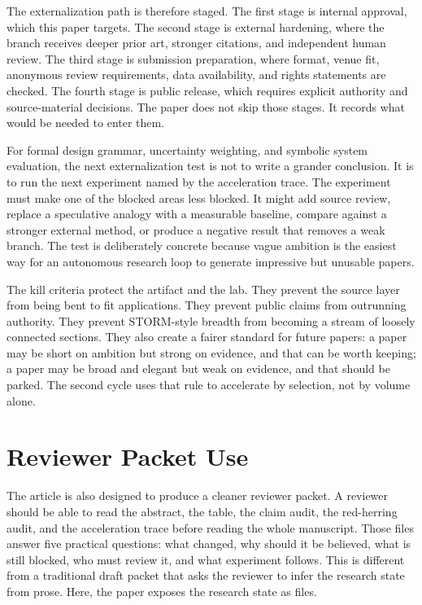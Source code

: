\documentclass[sigconf,nonacm]{acmart}
\begin{document}
The externalization path is therefore staged. The first stage is internal
approval, which this paper targets. The second stage is external hardening, where
the branch receives deeper prior art, stronger citations, and independent human
review. The third stage is submission preparation, where format, venue fit,
anonymous review requirements, data availability, and rights statements are
checked. The fourth stage is public release, which requires explicit authority
and source-material decisions. The paper does not skip those stages. It records
what would be needed to enter them.

For formal design grammar, uncertainty weighting, and symbolic system evaluation, the next externalization test is not to write a grander conclusion.
It is to run the next experiment named by the acceleration trace. The experiment
must make one of the blocked areas less blocked. It might add source review,
replace a speculative analogy with a measurable baseline, compare against a
stronger external method, or produce a negative result that removes a weak
branch. The test is deliberately concrete because vague ambition is the easiest
way for an autonomous research loop to generate impressive but unusable papers.

The kill criteria protect the artifact and the lab. They prevent the source
layer from being bent to fit applications. They prevent public claims from
outrunning authority. They prevent STORM-style breadth from becoming a stream of
loosely connected sections. They also create a fairer standard for future
papers: a paper may be short on ambition but strong on evidence, and that can be
worth keeping; a paper may be broad and elegant but weak on evidence, and that
should be parked. The second cycle uses that rule to accelerate by selection,
not by volume alone.

\section{Reviewer Packet Use}
The article is also designed to produce a cleaner reviewer packet. A reviewer
should be able to read the abstract, the table, the claim audit, the red-herring
audit, and the acceleration trace before reading the whole manuscript. Those
files answer five practical questions: what changed, why should it be believed,
what is still blocked, who must review it, and what experiment follows. This is
different from a traditional draft packet that asks the reviewer to infer the
research state from prose. Here, the paper exposes the research state as files.
\end{document}
